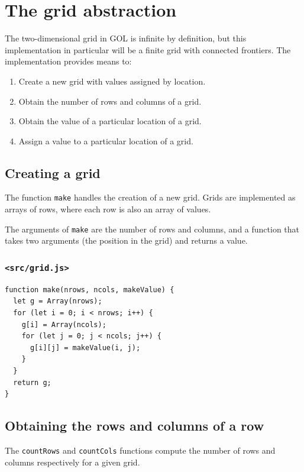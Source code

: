 \documentclass[11pt]{article}
\begin{document}
\section{The grid abstraction}
\label{sec:orgc0c541f}

The two-dimensional grid in GOL is infinite by definition, but this implementation in particular will be a finite grid with connected frontiers. The implementation provides means to:
\begin{enumerate}
\item Create a new grid with values assigned by location.
\item Obtain the number of rows and columns of a grid.
\item Obtain the value of a particular location of a grid.
\item Assign a value to a particular location of a grid.
\end{enumerate}

\subsection{Creating a grid}
\label{sec:org3697b07}

The function \texttt{make} handles the creation of a new grid. Grids are implemented as arrays of rows, where each row is also an array of values.

The arguments of \texttt{make} are the number of rows and columns, and a function that takes two arguments (the position in the grid) and returns a value.

\subsubsection*{\texttt{<src/grid.js>}}
\label{sec:org70bb8e7}
\begin{verbatim}
function make(nrows, ncols, makeValue) {
  let g = Array(nrows);
  for (let i = 0; i < nrows; i++) {
    g[i] = Array(ncols);
    for (let j = 0; j < ncols; j++) {
      g[i][j] = makeValue(i, j);
    }
  }
  return g;
}
\end{verbatim}

\subsection{Obtaining the rows and columns of a row}
\label{sec:org3b5dc1a}

The \texttt{countRows} and \texttt{countCols} functions compute the number of rows and columns respectively for a given grid.
\end{document}
